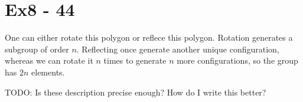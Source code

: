 \section*{Ex8 - 44}
One can either rotate this polygon or reflece this polygon. Rotation generates a subgroup of order $ n $. Reflecting once generate another unique configuration, whereas we can rotate it $ n $ times to generate $ n $ more configurations, so the group has $ 2n $ elements.

TODO: Is these description precise enough? How do I write this better?